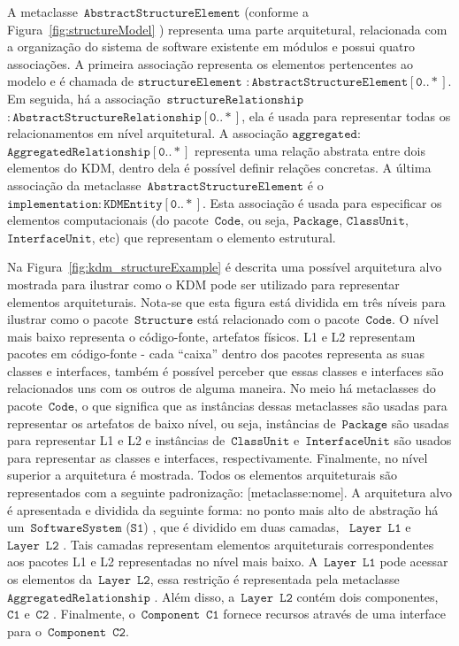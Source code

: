 \documentclass[12pt]{article}
\begin{document}
A metaclasse~$\mathtt{AbstractStructureElement}$ (conforme a Figura~\ref{fig:structureModel} ) representa uma parte arquitetural, relacionada com a organização do sistema de software existente em módulos e possui quatro associações. A primeira associação representa os elementos pertencentes ao modelo e é chamada de $\mathtt{structureElement}$ $\mathtt{:AbstractStructureElement[0..*]}$. Em seguida, há a associação~$\mathtt{structureRelationship}$ $\mathtt{:AbstractStructureRelationship[0..*]}$, ela é usada para representar todas os relacionamentos em nível arquitetural. A associação $\mathtt{aggregated:}$ $\mathtt{AggregatedRelationship[0..*]}$ representa uma relação abstrata entre dois elementos do KDM, dentro dela é possível definir relações concretas. A última associação da metaclasse~$\mathtt{AbstractStructureElement}$ é o~$\mathtt{implementation:KDMEntity[0..*]}$. Esta associação é usada para especificar os elementos computacionais (do pacote~$\mathtt{Code}$, ou seja, $\mathtt{Package}$, $\mathtt{ClassUnit}$, $\mathtt{InterfaceUnit}$, etc) que representam o elemento estrutural. 


Na Figura~\ref{fig:kdm_structureExample} é descrita uma possível arquitetura alvo mostrada para ilustrar como o KDM pode ser utilizado para representar elementos arquiteturais. Nota-se que esta figura está dividida em três níveis para ilustrar como o pacote~$\mathtt{Structure}$ está relacionado com o pacote~$\mathtt{Code}$. O nível mais baixo representa o código-fonte, artefatos físicos. L1 e L2 representam pacotes em código-fonte - cada ``caixa'' dentro dos pacotes representa as suas classes e interfaces, também é possível perceber que essas classes e interfaces são relacionados uns com os outros de alguma maneira. No meio há metaclasses do pacote~$\mathtt{Code}$, o que significa que as instâncias dessas metaclasses são usadas para representar os artefatos de baixo nível, ou seja, instâncias de~$\mathtt{Package}$ são usadas para representar L1 e L2 e instâncias de~$\mathtt{ClassUnit}$ e~$\mathtt{InterfaceUnit}$ são usados para representar as classes e interfaces, respectivamente. Finalmente, no nível superior a arquitetura é mostrada. Todos os elementos arquiteturais são representados com a seguinte padronização: [metaclasse:nome]. A arquitetura alvo é apresentada e dividida da seguinte forma: no ponto mais alto de abstração há um~$\mathtt{SoftwareSystem}$ ($\mathtt{S1}$) , que é dividido em duas camadas, ~$\mathtt{Layer}$~$\mathtt{L1}$  e ~$\mathtt{Layer}$~$\mathtt{L2}$ . Tais camadas representam elementos arquiteturais correspondentes aos pacotes L1 e L2 representadas no nível mais baixo. A~$\mathtt{Layer}$~$\mathtt{L1}$ pode acessar os elementos da~$\mathtt{Layer}$~$\mathtt{L2}$, essa restrição  é representada pela metaclasse~$\mathtt{AggregatedRelationship}$ . Além disso, a~$\mathtt{Layer}$~$\mathtt{L2}$ contém dois componentes,~$\mathtt{C1}$  e~$\mathtt{C2}$ . Finalmente, o~$\mathtt{Component}$~$\mathtt{C1}$ fornece recursos através de uma interface para o~$\mathtt{Component}$~$\mathtt{C2}$.
\end{document}
